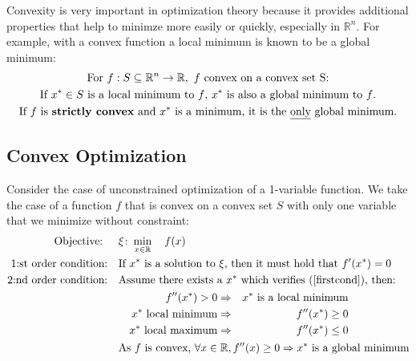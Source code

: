 \documentclass[../convex_optimization.tex]{subfiles}
\theoremstyle{definition} \newtheorem{defi}{Def}
\theoremstyle{definition} \newtheorem{prop}{Prop}
\begin{document}
Convexity is very important in optimization theory because it provides
additional properties that help to minimze more easily or quickly,
especially in $\mathbb R^n$. For example, with a convex function
a local minimum is known to be a global minimum:
\begin{gather}
    \text{For } f: S \subseteq \mathbb R^n \to \mathbb R,
    \text{ $f$ convex on a convex set S:}
    \nonumber\\
    \text{If } x^* \in S \text{ is a local minimum to $f$, } 
    x^* \text{ is also a global minimum to $f$.}\\
    \text{If $f$ is \textbf{strictly convex} and $x^*$ is a minimum,
    it is the \underline{only} global minimum.}
\end{gather}
\subsection{Convex Optimization}
Consider the case of unconstrained optimization of a 1-variable function.
We take the case of a function $f$ that is convex on a convex set $S$
with only one variable that we minimize without constraint:
\begin{align}
    \text{Objective: } &\quad\xi\colon \min_{x\in\mathbb R} \quad f(x)
    \nonumber\\
    \text{1:st order condition:} &\quad
    \text{If $x^*$ is a solution to $\xi$,
    then it must hold that $f'(x^*) = 0$}\label{firstcond}\\
    \text{2:nd order condition:} &\quad
    \text{Assume there exists a $x^*$ which verifies (\ref{firstcond}), then:}
    \nonumber\\& \qquad
    \begin{aligned}
        f''(x^*) > 0 &\Rightarrow & x^* \text{ is a local minimum}\\
        x^* \text{ local minimum} & \Rightarrow & f''(x^*) \geq 0\\
        x^* \text{ local maximum} & \Rightarrow & f''(x^*) \leq 0
    \end{aligned}\\
    &\quad
    \text{As $f$ is convex, } \forall x \in\mathbb R, f''(x) \geq 0
    \Rightarrow x^* \text{ is a global minimum}\nonumber
\end{align}
\end{document}
